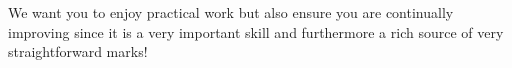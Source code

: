 \documentclass[a4paper,12pt,twoside]{exam}
\begin{document}
We want you to enjoy practical work but also ensure you are continually improving since it is a very important skill and furthermore a rich source of very straightforward marks!

\cleardoublepage





\cleardoublepage



\cleardoublepage





\cleardoublepage



\cleardoublepage





\cleardoublepage




\end{document}
